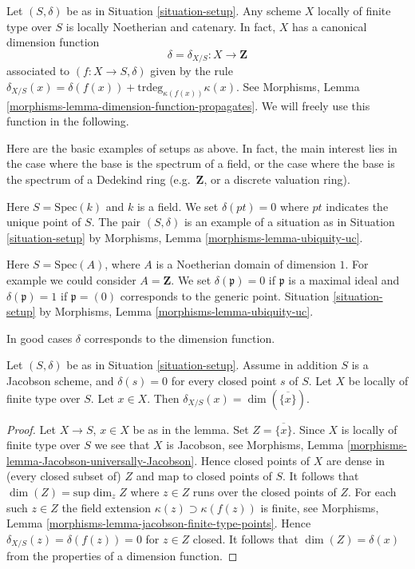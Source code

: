 \medskip\noindent
Let $(S, \delta)$ be as in Situation \ref{situation-setup}.
Any scheme $X$ locally of finite type over $S$ is locally Noetherian
and catenary. In fact, $X$ has a canonical dimension function
$$
\delta = \delta_{X/S} : X \longrightarrow \mathbf{Z}
$$
associated to $(f : X \to S, \delta)$ given by the rule
$\delta_{X/S}(x) = \delta(f(x)) + \text{trdeg}_{\kappa(f(x))}\kappa(x)$.
See Morphisms, Lemma \ref{morphisms-lemma-dimension-function-propagates}.
We will freely use this function in the following.

\medskip\noindent
Here are the basic examples of setups as above.
In fact, the main interest lies in the case where the base
is the spectrum of a field, or the case where the base
is the spectrum of a Dedekind ring (e.g.\ $\mathbf{Z}$,
or a discrete valuation ring).

\begin{example}
\label{example-field}
Here $S = \text{Spec}(k)$ and $k$ is a field.
We set $\delta(pt) = 0$ where $pt$ indicates the unique point of $S$.
The pair $(S, \delta)$ is an example of a situation as in
Situation \ref{situation-setup} by
Morphisms, Lemma \ref{morphisms-lemma-ubiquity-uc}.
\end{example}

\begin{example}
\label{example-domain-dimension-1}
Here $S = \text{Spec}(A)$, where $A$ is a Noetherian domain
of dimension $1$.
For example we could consider $A = \mathbf{Z}$.
We set $\delta(\mathfrak p) = 0$ if
$\mathfrak p$ is a maximal ideal and $\delta(\mathfrak p) = 1$
if $\mathfrak p = (0)$ corresponds to the generic point.
Situation \ref{situation-setup} by
Morphisms, Lemma \ref{morphisms-lemma-ubiquity-uc}.
\end{example}

\noindent
In good cases $\delta$ corresponds to the dimension function.

\begin{lemma}
\label{lemma-delta-is-dimension}
Let $(S, \delta)$ be as in Situation \ref{situation-setup}.
Assume in addition $S$ is a Jacobson scheme, and $\delta(s) = 0$ for every
closed point $s$ of $S$. Let $X$ be locally of finite type over $S$.
Let $x \in X$. Then $\delta_{X/S}(x) = \dim(\overline{\{x\}})$.
\end{lemma}

\begin{proof}
Let $X \to S$, $x \in X$ be as in the lemma.
Set $Z = \overline{\{x\}}$.
Since $X$ is locally of finite type over $S$ we see that
$X$ is Jacobson, see
Morphisms, Lemma \ref{morphisms-lemma-Jacobson-universally-Jacobson}.
Hence closed points of $X$ are dense in (every closed subset of) $Z$
and map to closed points of $S$. It follows that
$\dim(Z) = \text{sup} \dim_z Z$ where $z \in Z$ runs over the closed points
of $Z$. For each such $z \in Z$ the field extension
$\kappa(z) \supset \kappa(f(z))$ is finite, see Morphisms,
Lemma \ref{morphisms-lemma-jacobson-finite-type-points}.
Hence $\delta_{X/S}(z) = \delta(f(z)) = 0$
for $z \in Z$ closed. It follows that $\dim(Z) = \delta(x)$ from
the properties of a dimension function.
\end{proof}

